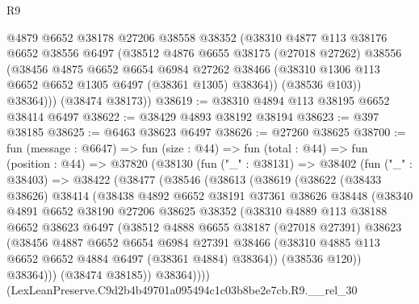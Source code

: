 \begin{lexlean}{R9}
\begin{coremodule}
          @4879
          @6652
          @38178
          @27206
          @38558
          @38352
          (@38310
            @4877
            @113
            @38176
            @6652
            @38556
            @6497
            (@38512
              @4876
              @6655
              @38175
              (@27018 @27262)
              @38556
              (@38456
                @4875
                @6652
                @6654
                @6984
                @27262
                @38466
                (@38310 @1306 @113 @6652 @6652 @1305 @6497 (@38361 @1305) @38364))
              (@38536 @103))
            @38364)))
      (@38474 @38173))
@38619 := @38310 @4894 @113 @38195 @6652 @38414 @6497
@38622 := @38429 @4893 @38192 @38194
@38623 := @397 @38185
@38625 := @6463 @38623 @6497
@38626 := @27260 @38625
@38700 := fun (message : @6647) =>
  fun (size : @44) =>
  fun (total : @44) =>
  fun (position : @44) =>
  @37820
    (@38130
      (fun ("_" : @38131) =>
      @38402
        (fun ("_" : @38403) =>
        @38422
          (@38477
            (@38546
              (@38613
                (@38619
                  (@38622
                    (@38433 @38626)
                    @38414
                    (@38438
                      @4892
                      @6652
                      @38191
                      @37361
                      @38626
                      @38448
                      (@38340
                        @4891
                        @6652
                        @38190
                        @27206
                        @38625
                        @38352
                        (@38310
                          @4889
                          @113
                          @38188
                          @6652
                          @38623
                          @6497
                          (@38512
                            @4888
                            @6655
                            @38187
                            (@27018 @27391)
                            @38623
                            (@38456
                              @4887
                              @6652
                              @6654
                              @6984
                              @27391
                              @38466
                              (@38310 @4885 @113 @6652 @6652 @4884 @6497 (@38361 @4884) @38364))
                            (@38536 @120))
                          @38364)))
                    (@38474 @38185))
                  @38364))))
          (LexLeanPreserve.C9d2b4b49701a095494c1c03b8be2e7cb.R9.__rel_30

\end{coremodule}
\end{lexlean}
